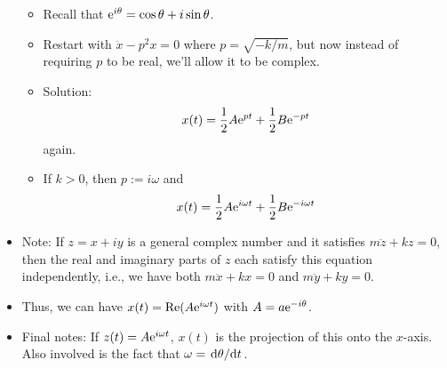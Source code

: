 \documentclass[../notes.tex]{subfiles}
\begin{document}
\begin{itemize}
    \begin{itemize}
        \item Recall that $\e[i\theta]=\cos\theta+i\sin\theta$.
        \item Restart with $\ddot{x}-p^2x=0$ where $p=\sqrt{-k/m}$, but now instead of requiring $p$ to be real, we'll allow it to be complex.
        \item Solution:
        \begin{equation*}
            x(t) = \frac{1}{2}A\e[pt]+\frac{1}{2}B\e[-pt]
        \end{equation*}
        again.
        \item If $k>0$, then $p:=i\omega$ and
        \begin{equation*}
            x(t) = \frac{1}{2}A\e[i\omega t]+\frac{1}{2}B\e[-i\omega t]
        \end{equation*}
    \end{itemize}
    \item Note: If $z=x+iy$ is a general complex number and it satisfies $m\ddot{z}+kz=0$, then the real and imaginary parts of $z$ each satisfy this equation independently, i.e., we have both $m\ddot{x}+kx=0$ and $m\ddot{y}+ky=0$.
    \item Thus, we can have $x(t)=\re(A\e[i\omega t])$ with $A=a\e[-i\theta]$.
    \item Final notes: If $z(t)=A\e[i\omega t]$, $x(t)$ is the projection of this onto the $x$-axis. Also involved is the fact that $\omega=\dv*{\theta}{t}$.
\end{itemize}
\end{document}
